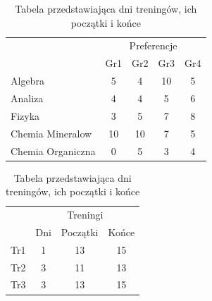 \documentclass{article}
\begin{document}
\begin{table}[h]
    \centering
    \begin{minipage}{0.45\textwidth}
        \centering
        \begin{tabular}{l|cccc}
            & \multicolumn{4}{c}{Preferencje} \\
            & Gr1 & Gr2 & Gr3 & Gr4 \\
            \hline
            Algebra & 5 & 4 & 10 & 5 \\
            Analiza & 4 & 4 & 5 & 6 \\
            Fizyka & 3 & 5 & 7 & 8 \\
            Chemia Mineralow & 10 & 10 & 7 & 5 \\
            Chemia Organiczna & 0 & 5 & 3 & 4 \\
        \end{tabular}
        \caption{Tabela przedstawiająca preferencje dla różnych grup}
        \label{tab:preferencje}
    \end{minipage}
    \hspace{0.5cm}
    \begin{minipage}{0.45\textwidth}
        \centering
        \begin{tabular}{l|ccc}
            & \multicolumn{3}{c}{Treningi} \\
            & Dni & Początki & Końce \\
            \hline
            Tr1 & 1 & 13 & 15 \\
            Tr2 & 3 & 11 & 13 \\
            Tr3 & 3 & 13 & 15 \\
        \end{tabular}
        \caption{Tabela przedstawiająca dni treningów, ich początki i końce}
        \label{tab:treningi}
    \end{minipage}
\end{table}

\newpage
\end{document}
